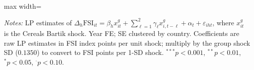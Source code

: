 \begin{table}[htbp]
\begin{adjustbox}{max width=\textwidth}
\begin{threeparttable}
\begin{tablenotes}\small
\item \textit{Notes:} LP estimates of $\Delta_h\text{FSI}_{it} = \beta_h x^g_{it} + \sum_{\ell=1}^{2}\gamma_\ell x^g_{i,t-\ell} + \alpha_t + \varepsilon_{iht}$, where $x^g_{it}$ is the Cereals Bartik shock. Year FE; SE clustered by country. Coefficients are raw LP estimates in FSI index points per unit shock; multiply by the group shock SD ($0.1350$) to convert to FSI points per 1-SD shock. $^{***}p<0.001$, $^{**}p<0.01$, $^{*}p<0.05$, $^{\cdot}p<0.10$.
\end{tablenotes}
\end{threeparttable}
\end{adjustbox}
\end{table}
